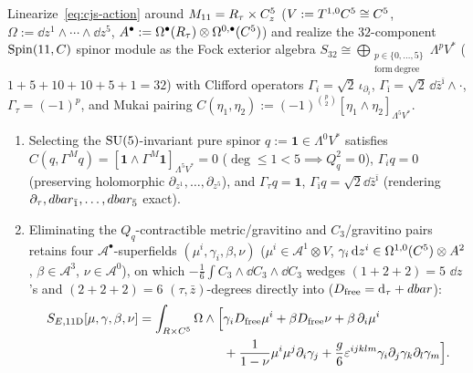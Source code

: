 \begin{theorem}
\label{thm:11d-from-scratch}
Linearize~\eqref{eq:cjs-action} around $M_{11} = R_\tau \times C^5_z$ ($V := T^{1,0}C^5 \cong C^5$, $\Omega := \dd z^1\wedge\cdots\wedge\dd z^5$, $A^\bullet := \Omega^\bullet(R_\tau)\otimes\Omega^{0,\bullet}(C^5)$) and realize the $32$-component $\operatorname{Spin}(11,C)$ spinor module as the Fock exterior algebra $S_{32} \cong \bigoplus_{\substack{p\in\{0,\dots,5\}\\\mathrm{form\ degree}}}\Lambda^p V^*$ ($1+5+10+10+5+1 = 32$) with Clifford operators $\Gamma_i = \sqrt{2}\,\iota_{\partial_i}$, $\Gamma_{\bar{\imath}} = \sqrt{2}\,\dd\bar{z}^{\bar{\imath}}\wedge\cdot$, $\Gamma_\tau = (-1)^p$, and Mukai pairing $C(\eta_1,\eta_2) := (-1)^{\binom{p}{2}}[\eta_1\wedge\eta_2]_{\Lambda^5 V^*}$.
\begin{enumerate}[label=(\arabic*),leftmargin=*]
  \item Selecting the $\operatorname{SU}(5)$-invariant pure spinor $q := \mathbf{1} \in \Lambda^0 V^*$ satisfies $C(q,\Gamma^M q) = [\mathbf{1}\wedge\Gamma^M\mathbf{1}]_{\Lambda^5 V^*} = 0$ ($\deg \le 1 < 5 \implies Q_q^2 = 0$), $\Gamma_i q = 0$ (preserving holomorphic $\partial_{z^1},\dots,\partial_{z^5}$), and $\Gamma_\tau q = \mathbf{1}$, $\Gamma_{\bar{\imath}}q = \sqrt{2}\dd\bar{z}^{\bar{\imath}}$ (rendering $\partial_\tau, dbar_{\bar{1}},\dots,dbar_{\bar{5}}$ exact).
  \item Eliminating the $Q_q$-contractible metric/gravitino and $C_3$/gravitino pairs retains four $\mathcal{A}^\bullet$-superfields $(\mu^i, \gamma_i, \beta, \nu)$ ($\mu^i \in \mathcal{A}^1\otimes V$, $\gamma_i\,\mathrm{d} z^i \in \Omega^{1,0}(C^5)\otimes A^2$, $\beta \in \mathcal{A}^3$, $\nu \in \mathcal{A}^0$), on which $-\frac{1}{6}\int C_3\wedge\dd C_3\wedge\dd C_3$ wedges $(1+2+2)=5$ $\dd z$'s and $(2+2+2)=6$ $(\tau,\bar{z})$-degrees directly into ($D_{\mathrm{free}} = \mathrm{d}_\tau + dbar$):
  \begin{equation}
  \label{eq:11d-twisted-action}
  \begin{aligned}
  S_{E,11\mathrm{D}}[\mu,\gamma,\beta,\nu] = \int_{\RR\times\C^5}\Omega\wedge\Bigl[&\gamma_i D_{\mathrm{free}}\mu^i + \beta D_{\mathrm{free}}\nu + \beta\,\partial_i\mu^i\\
  &+ \frac{1}{1-\nu}\mu^i\mu^j\partial_i\gamma_j + \frac{g}{6}\eps^{ijklm}\gamma_i\partial_j\gamma_k\partial_l\gamma_m\Bigr].
  \end{aligned}

\end{equation}
\end{enumerate}
\end{theorem}

